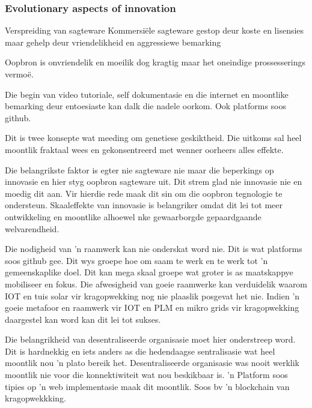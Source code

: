\documentclass{beamer}
\begin{document}


\begin{frame}
\frametitle{Evolutionary aspects of innovation}

Verspreiding van sagteware
Kommersiële sagteware gestop deur koste en lisensies maar gehelp deur vriendelikheid en aggressiewe bemarking

Oopbron is onvriendelik en moeilik dog kragtig maar het oneindige prossesserings vermoë.

Die begin van video tutoriale, self dokumentasie en die internet en moontlike bemarking deur entoesiaste kan dalk die nadele oorkom. Ook platforms soos github. 

Dit is twee konsepte wat meeding om genetiese geskiktheid. Die uitkoms sal heel moontlik fraktaal wees en gekonsentreerd met wenner oorheers alles effekte.

Die belangrikste faktor is egter nie sagteware nie maar die beperkings op innovasie en hier styg oopbron sagteware uit. Dit strem glad nie innovasie nie en moedig dit aan. Vir hierdie rede maak dit sin om die oopbron tegnologie te ondersteun. Skaaleffekte van innovasie is belangriker omdat dit lei tot meer ontwikkeling en moontlike alhoewel nke gewaarborgde gepaardgaande welvarendheid.

Die nodigheid van 'n raamwerk kan nie onderskat word nie. Dit is wat platforms soos github gee. Dit wys groepe hoe om saam te werk en te werk tot 'n gemeenskaplike doel. Dit kan mega skaal groepe wat groter is as maatskappye mobiliseer en fokus. Die afwesigheid van goeie raamwerke kan verduidelik waarom IOT en tuis solar vir kragopwekking nog nie plaaslik posgevat het nie. Indien 'n goeie metafoor en raamwerk vir IOT en PLM en mikro grids vir kragopwekking daargestel kan word kan dit lei tot sukses.

Die belangrikheid van desentraliseerde organisasie moet hier onderstreep word. Dit is hardnekkig en iets anders as die hedendaagse sentralisasie wat heel moontlik nou 'n plato bereik het. Desentraliseerde organisasie was nooit werklik moontlik nie voor die konnektiwiteit wat nou beskikbaar is. 'n Platform soos tipies op 'n web implementasie maak dit moontlik. Soos bv 'n blockchain van kragopwekkking.

\end{frame}

\end{document}
